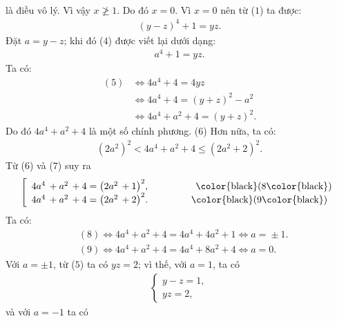\begin{multicols}{2}
\begin{align*}
	\end{align*}
	là điều vô lý. Vì vậy $x \not\ge 1$. Do đó $x= 0$.
	\vskip 0.05cm
	Vì $x= 0$ nên từ ($1$) ta được:
	\begin{align*}
		(y-z)^4 + 1 = yz. \tag{$4$}
	\end{align*}
	Đặt $a=y - z$; khi đó ($4$) được viết lại dưới dạng:
	\begin{align*}
		a^4 + 1 = yz. \tag{$5$}
	\end{align*}
	Ta có:
	\begin{align*}
		(5) &\Leftrightarrow 4a^4 + 4 = 4yz \\
		&\Leftrightarrow 4a^4 + 4 = (y+z)^2 - a^2\\
		&\Leftrightarrow 4a^4 + a^2 + 4 = (y+ z)^2.
	\end{align*}
	Do đó $4a^4 + a^2 + 4$  là một số chính \linebreak phương.       \hfill ($6$)
	\vskip 0.05cm
	Hơn nữa, ta có:
	\begin{align*}
		{\left({2{a^2}} \right)^2}\! <\! 4{a^4}\! +\! {a^2}\! + \!4 \!\le\! {\left( {2{a^2}\! +\! 2} \right)^2}.\tag{$7$}
	\end{align*}
	Từ ($6$) và ($7$) suy ra
	\begin{align*}
		\left[ \begin{array}{l}
			4{a^4}\, + {a^2}\, + 4 = {\left( {2{a^2}\, + 1} \right)^2}, \hspace*{48pt} \text{\color{black}(}8\text{\color{black})}\\
			4{a^4}\, + {a^2}\, + 4 = {\left( {2{a^2}\, + 2} \right)^2}.\hspace*{45pt} \text{\color{black}(}9\text{\color{black})}
		\end{array} \right.
	\end{align*}
	Ta có:
	\begin{align*}
		&(8) \!\Leftrightarrow\! 4{a^4}\! +\! {a^2}\! +\! 4 \!=\! 4{a^4}\! +\! 4{a^2}\! + \!1 \!\Leftrightarrow\! a \!=\! \pm\! 1.\\
		&(9) \!\Leftrightarrow\! 4{a^4}\! +\! {a^2}\! +\! 4 \!= \!4{a^4}\! +\! 8{a^2}\! +\! 4 \!\Leftrightarrow \!a \!=\! 0.
	\end{align*}
	Với $a = \pm 1$,  từ ($5$) ta có $yz= 2$; vì thế, với $a= 1$, ta có
	\begin{align*}
		\begin{cases}
			y-z = 1,\\[-0.5ex]
			yz = 2, \tag{$10$}
		\end{cases}
	\end{align*}
	và với $a = -1$  ta có

\end{multicols}
